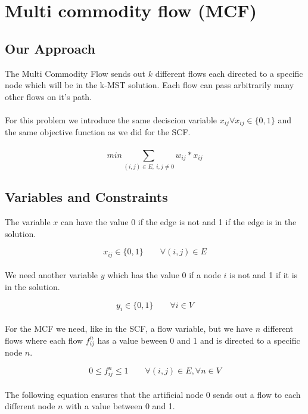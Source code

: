 \section{Multi commodity flow (MCF)}
\subsection{Our Approach}
The Multi Commodity Flow sends out $k$ different flows each directed to a specific node which will be in the k-MST solution. Each flow can pass arbitrarily many other flows on it's path.
\\
\\
For this problem we introduce the same deciscion variable $x_{ij} \forall x_{ij} \in \{0,1\}$ and the same objective function as we did for the SCF.\\
\\
\begin{equation}
  min \sum_{(i,j) \in E, \ i,j \not =  0} w_{ij} * x_{ij} 
\end{equation}

\subsection{Variables and Constraints}

The variable $x$ can have the value 0 if the edge is not and 1 if the edge is in the solution. 

\begin{equation}
  x_{ij} \in \{0,1\} \qquad \forall (i,j) \in E
\end{equation}
\\
We need another variable $y$ which has the value 0 if a node $i$ is not and 1 if it is in the solution.

\begin{equation}
  y_i \in \{0,1\} \qquad \forall i \in V
\end{equation}
\\
For the MCF we need, like in the SCF, a flow variable, but we have $n$ different flows where each flow $f_{ij}^n$ has a value beween 0 and 1 and is directed to a specific node $n$.

\begin{equation}
  0 \leq f_{ij}^n \leq 1 \qquad \forall (i,j) \in E, \forall n \in V
\end{equation}
\\
The following equation ensures that the artificial node $0$ sends out a flow to each different node $n$ with a value between 0 and 1.

